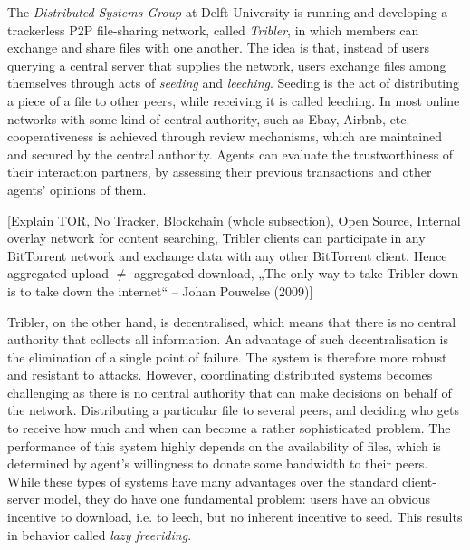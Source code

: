 \documentclass[11pt,a4paper]{article}
\theoremstyle{definition}
\theoremstyle{theorem}
\theoremstyle{proposition}
\theoremstyle{corollary}
\theoremstyle{lemma}
\theoremstyle{example}
\theoremstyle{remark}
\begin{document}
\noindent{}The {\it Distributed Systems Group} at Delft University is running and developing a trackerless P2P file-sharing network, called {\it Tribler}, in which members can exchange and share files with one another. The idea is that, instead of users querying a central server that supplies the network, users exchange files among themselves through acts of {\it seeding} and {\it leeching}. Seeding is the act of distributing a piece of a file to other peers, while receiving it is called leeching. In most online networks with some kind of central authority, such as Ebay, Airbnb, etc. cooperativeness is achieved through review mechanisms, which are maintained and secured by the central authority. Agents can evaluate the trustworthiness of their interaction partners, by assessing their previous transactions and other agents' opinions of them.\vspace{1em}\\ 

\noindent{} \begin{center} [Explain TOR, No Tracker, Blockchain (whole subsection), Open Source, Internal overlay network for content searching, Tribler clients can participate in any BitTorrent network and exchange data with any other BitTorrent client. Hence aggregated upload $\neq$ aggregated download, „The only way to take Tribler down is to take down the internet“ – Johan Pouwelse (2009)] \end{center}

\noindent{}Tribler, on the other hand, is decentralised, which means that there is no central authority that collects all information. An advantage of such decentralisation is the elimination of a single point of failure. The system is therefore more robust and resistant to attacks. However, coordinating distributed systems becomes challenging as there is no central authority that can make decisions on behalf of the network. Distributing a particular file to several peers, and deciding who gets to receive how much and when can become a rather sophisticated problem. The performance of this system highly depends on the availability of files, which is determined by agent's willingness to donate some bandwidth to their peers. While these types of systems have many advantages over the standard client-server model, they do have one fundamental problem: users have an obvious incentive to download, i.e. to leech, but no inherent incentive to seed. This results in behavior called {\it lazy freeriding}. \vspace{1em}\\
\end{document}
